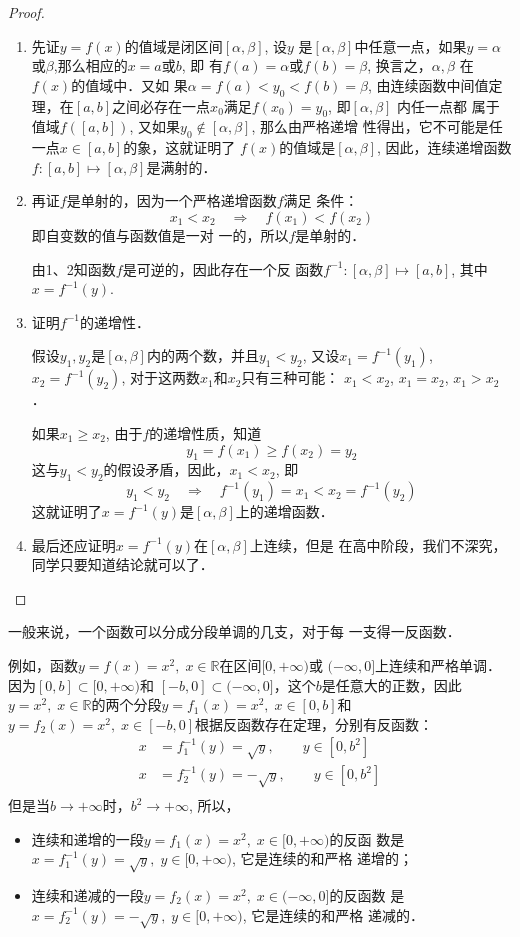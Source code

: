 \begin{proof}
\begin{enumerate}
\item 先证$y=f(x)$的值域是闭区间$[\alpha,\beta]$, 设$y$
是$[\alpha,\beta]$中任意一点，如果$y=\alpha$或$\beta$,那么相应的$x=a$或$b$, 即
有$f(a)=\alpha$或$f(b)=\beta$, 换言之，$\alpha ,\beta$  在$f(x)$的值域中．又如
果$\alpha=f(a)<y_0<f(b)=\beta  $, 由连续函数中间值定理，在$[a,
b]$之间必存在一点$x_0$满足$f(x_0)=y_0$, 即$[\alpha ,\beta]$  内任一点都
属于值域$f([a,b])$, 又如果$y_0\notin [\alpha ,\beta]$, 那么由严格递增
性得出，它不可能是任一点$x\in [a,b]$的象，这就证明了
$f(x)$的值域是$[\alpha,\beta]$, 因此，连续递增函数$f:[a,b]\mapsto [\alpha ,\beta]$是满射的．

\item 再证$f$是单射的，因为一个严格递增函数$f$满足
条件：$$x_1<x_2\quad \Rightarrow\quad f(x_1)<f(x_2)$$ 即自变数的值与函数值是一对
一的，所以$f$是单射的．

由1、2知函数$f$是可逆的，因此存在一个反
函数$f^{-1}:[\alpha,\beta]\mapsto [a,b]$, 其中$x=f^{-1}(y)$.
\item 证明$f^{-1}$的递增性．

假设$y_1,y_2$是$[\alpha,\beta]$内的两个数，并且$y_1<y_2$, 又设$x_1=f^{-1}(y_1)$, $x_2=f^{-1}(y_2)$, 对于这两数$x_1$和$x_2$只有三种可能：
$x_1<x_2$, $x_1=x_2$, $x_1>x_2$．

如果$x_1\ge x_2$, 由于$f$的递增性质，知道
\[y_1=f(x_1)\ge f(x_2)=y_2\]
这与$y_1<y_2$的假设矛盾，因此，$x_1<x_2$, 即
\[y_1<y_2 \quad \Rightarrow\quad f^{-1}(y_1)=x_1<x_2=f^{-1}(y_2)\]
这就证明了$x=f^{-1}(y)$是$[\alpha,\beta]$上的递增函数．
\item 最后还应证明$x=f^{-1}(y)$在$[\alpha,\beta]$上连续，但是
在高中阶段，我们不深究，同学只要知道结论就可以了．
\end{enumerate}    
\end{proof} 


一般来说，一个函数可以分成分段单调的几支，对于每
一支得一反函数．

例如，函数$y=f(x)=x^2,\; x\in\mathbb{R}$在区间$[0,+\infty)$或
$(-\infty,0]$上连续和严格单调．因为$[0,b]\subset [0,+\infty)$和
$[-b,0]\subset (-\infty,0]$，这个$b$是任意大的正数，因此$y=x^2,\; x\in\mathbb{R}$的两个分段$y=f_1(x)=x^2,\; x\in [0,b]$和$y=f_2(x)=x^2,\; x\in[-b,0]$根据反函数存在定理，分别有反函数：
\[\begin{split}
    x&=f^{-1}_1(y)=\sqrt{y},\qquad y\in [0,b^2]\\    
    x&=f^{-1}_2(y)=-\sqrt{y},\qquad y\in [0,b^2]\\
\end{split}\]
但是当$b\to+\infty$时，$b^2\to+\infty$, 所以，
\begin{itemize}
    \item 连续和递增的一段$y=f_1(x)=x^2,\; x\in[0,+\infty)$的反函
数是$x=f_1^{-1}(y)=\sqrt{y},\; y\in [0,+\infty)$, 它是连续的和严格
递增的；
\item 连续和递减的一段$y=f_2(x)=x^2,\; x\in(-\infty,0]$的反函数
是$x=f_2^{-1}(y)=-\sqrt{y},\; y\in[0,+\infty)$, 它是连续的和严格
递减的．
\end{itemize}

